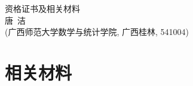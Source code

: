 \documentclass[UFT8]{ctexart}%
\begin{document}
\thispagestyle{empty} %
\vspace*{3cm}
\begin{center}
{{\LARGE\heiti 资格证书及相关材料}\\[0.6cm]
{\normalsize 唐\ 洁}\\[0.1cm]
{\small(广西师范大学数学与统计学院, 广西桂林, 541004)}}
\end{center}

\clearpage%
\tableofcontents%
\thispagestyle{empty} %

\clearpage%
\setcounter{page}{1}%

%
%
%
%
%
%
%
%


%

\section{相关材料}
\end{document}
